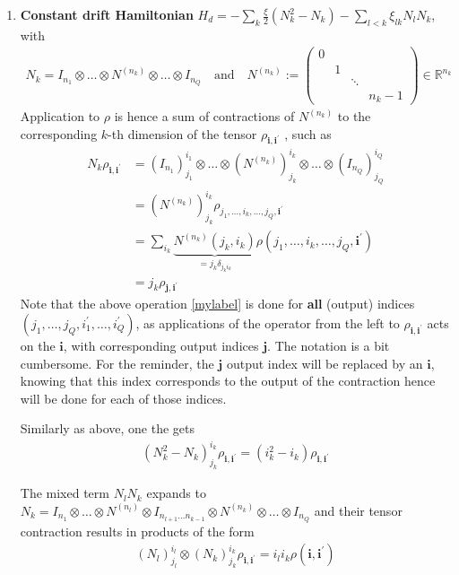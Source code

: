 \documentclass[letterpaper]{article}
\newcommand{\R}{\mathds{R}}
\newcommand{\bfi}{\boldsymbol{i}}
\newcommand{\bfj}{\boldsymbol{j}}
\newcommand{\p}{\prime}
\begin{document}
\begin{enumerate}
    \item \textbf{Constant drift Hamiltonian} $H_d = -\sum_k \frac{\xi}{2}
      \left(N_k^2 - N_k\right) - \sum_{l<k} \xi_{lk} N_lN_k$, with
      \begin{align}
      N_k = I_{n_1}\otimes \dots \otimes N^{(n_k)} \otimes \dots \otimes I_{n_Q}
        \quad \text{and} \quad N^{(n_k)} := \begin{pmatrix} 0 & & \\ & 1& \\ & &
        \ddots \\ & & & n_k -1\end{pmatrix} \in \R^{n_k}
      \end{align}
      Application to $\rho$ is hence a sum of contractions of $N^{(n_k)}$ to the
      corresponding $k$-th dimension of the tensor $\rho_{\bfi, \bfi^\p}$ , such
      as
      \begin{align}
        N_k \rho_{\bfi, \bfi^\p} &=  \left(I_{n_1}\right)^{i_1}_{j_1}\otimes
        \dots \otimes \left(N^{(n_k)}\right)^{i_k}_{j_k} \otimes \dots \otimes
        \left(I_{n_Q}\right)^{i_Q}_{j_Q} \label{mylabel} \\ 
        &= \left(N^{(n_k)}\right)_{j_k}^{i_k} \rho_{j_1,\dots, i_k, \dots, j_Q,
        \bfi^\p} \\
        &= \sum_{i_k} \underbrace{N^{(n_k)}(j_k, i_k)}_{ = j_k\delta_{j_ki_k} }
        \rho(j_1,\dots, i_k,\dots, j_Q, \bfi^\p) \\
        &= j_k \rho_{\bfj, \bfi^\p}
      \end{align}
      Note that the above operation \eqref{mylabel} is done for \textbf{all}
      (output) indices $(j_1, \dots, j_Q, i_1^\p,\dots,i_Q^\p)$, as applications
      of the operator from the left to $\rho_{\bfi, \bfi^\p}$ acts on the
      $\bfi$, with corresponding output indices $\bfj$. The notation is a bit
      cumbersome. For the reminder, the $\bfj$ output index will be replaced by
      an $\bfi$, knowing that this index corresponds to the output of the
      contraction hence will be done for each of those indices. 

      Similarly as above, one the gets
      \begin{align}
        \left(N_k^2-N_k\right)_{j_k}^{i_k} \rho_{\bfi, \bfi^\p} = \left(i_k^2 -
        i_k\right) \rho_{\bfi,\bfi^\prime}
      \end{align}

      The mixed term $N_lN_k$ expands to $N_k = I_{n_1}\otimes \dots \otimes
      N^{(n_l)} \otimes I_{n_{l+1} \dots n_{k-1}}\otimes N^{(n_k)} \otimes \dots
      \otimes I_{n_Q}$ and their tensor contraction results in products of the
      form 
      \begin{align}
        (N_l)^{i_l}_{j_l} \otimes (N_k)_{j_k}^{i_k} \rho_{\bfi, \bfi^\p} =
        i_li_k\rho(\bfi, \bfi^\prime)
      \end{align}


\end{enumerate}
\end{document}
